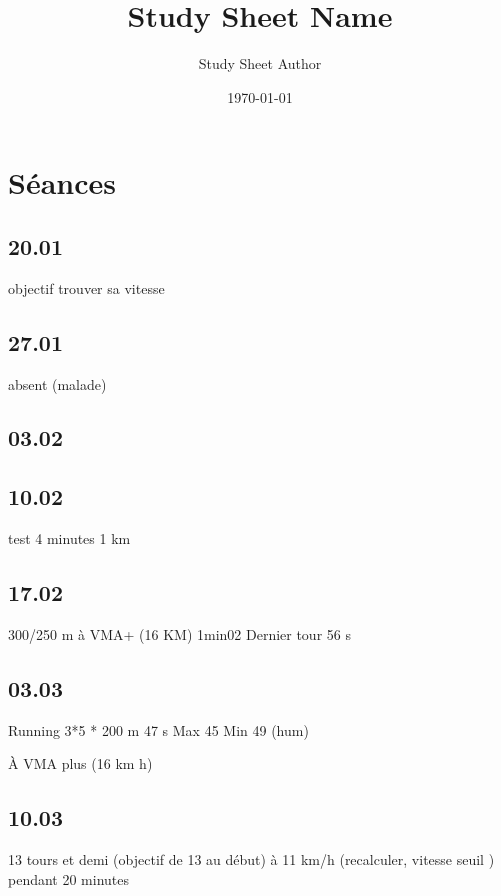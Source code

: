 \documentclass{article}%
\title{Study Sheet Name}%
\author{Study Sheet Author}%
\date{\today}%
\begin{document}
%
\normalsize%
\maketitle%
\tableofcontents%
\newpage%

\maketitle

\section{Séances}
    \subsection{20.01}
    objectif trouver sa vitesse
    
    \subsection{27.01}
        absent (malade)
    
    
    \subsection{03.02}
    
    
    \subsection{10.02}
        test 4 minutes 1 km
    
    
    \subsection{17.02}
        300/250 m à VMA+ (16 KM)
        1min02
        Dernier tour 56 s
    
    
    \subsection{03.03}
        Running 3*5 * 200 m
        47 s
        Max 45 
        Min 49 (hum)
        
        À VMA plus (16 km h)
        
        
    \subsection{10.03}
        13 tours et demi (objectif de 13 au début)
        à 11 km/h (recalculer, vitesse seuil ) pendant 20 minutes
    
\end{document}

